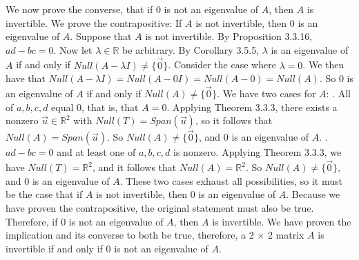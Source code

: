 \documentclass[12pt]{article}
\newenvironment{problem}[2][Problem]
{
	\begin{trivlist} 
		\item[\hskip \labelsep {\bfseries #1 #2:}]
	}
{
	\end{trivlist}
	}
\newenvironment{solution}[1][Solution]
{
	\begin{trivlist} 
		\item[\hskip \labelsep {\itshape #1:}]
	}
	{
	\end{trivlist}
}
\begin{document}
\begin{problem}{1}
\begin{solution}
We now prove the converse, that if 0 is not an eigenvalue of $A$, then $A$ is invertible. We prove the contrapositive: If $A$ is not invertible, then 0 is an eigenvalue of $A$. Suppose that $A$ is not invertible. By Proposition 3.3.16, $ad-bc = 0$. Now let $\lambda \in \mathbb{R}$ be arbitrary. By Corollary 3.5.5, $\lambda$ is an eigenvalue of $A$ if and only if $Null(A-\lambda I) \neq \{\vec{0}\}$. Consider the case where $\lambda = 0$. We then have that $Null(A-\lambda I) = Null(A-0I) = Null(A-0) = Null(A)$. So 0 is an eigenvalue of $A$ if and only if $Null(A)\neq\{\vec{0}\}$. We have two cases for $A$:
\newline
\newline
{}. All of $a,b,c,d$ equal 0, that is, that $A = 0$. Applying Theorem 3.3.3, there exists a nonzero $\vec{u} \in \mathbb{R}^2$ with $Null(T) = Span(\vec{u})$, so it follows that $Null(A)= Span(\vec{u})$. So $Null(A)\neq \{\vec{0}\}$, and 0 is an eigenvalue of $A$.
\newline
\newline
{}. $ad-bc=0$ and at least one of $a,b,c,d$ is nonzero. Applying Theorem 3.3.3, we have $Null(T) = \mathbb{R}^2$, and it follows that $Null(A)=\mathbb{R}^2$. So $Null(A)\neq \{\vec{0}\}$, and 0 is an eigenvalue of $A$.
\newline
\newline
These two cases exhaust all possibilities, so it must be the case that if $A$ is not invertible, then 0 is an eigenvalue of $A$. Because we have proven the contrapositive, the original statement must also be true. Therefore, if 0 is not an eigenvalue of $A$, then $A$ is invertible. We have proven the implication and its converse to both be true, therefore, a 2 $\times$ 2 matrix $A$ is invertible if and only if $0$ is not an eigenvalue of $A$.
\end{solution}
\end{problem}
\end{document}
